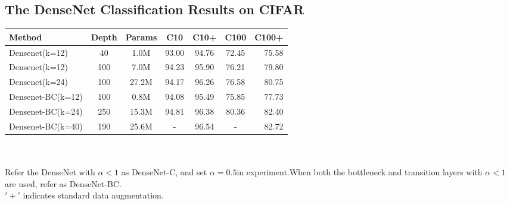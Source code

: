 \subsection{The DenseNet Classification Results on CIFAR}
\begin{tabular}{| l | c | c | c  | c | c | r |}
	\hline
	Method              &   Depth   & Params   & C10    & C10+    & C100   &   C100+ \\
	\hline
	Densenet(k=12)      &    40     & 1.0M     & 93.00  & 94.76   & 72.45  &   75.58  \\
	\hline
	Densenet(k=12)      &   100     & 7.0M     & 94.23  & 95.90   & 76.21  &   79.80  \\
	\hline
	Densenet(k=24)      &   100     & 27.2M    & 94.17  & 96.26   & 76.58  &   80.75  \\
	\hline
	Densenet-BC(k=12)   &   100     & 0.8M     & 94.08  & 95.49   & 75.85  &   77.73  \\
	\hline
	Densenet-BC(k=24)   &   250     & 15.3M    & 94.81  & 96.38   & 80.36  &   82.40  \\
	\hline
	Densenet-BC(k=40)   &   190     & 25.6M    & -      & 96.54   & -      &   82.72  \\
	\hline
\end{tabular}
\\ \hspace*{\fill} \\
Refer the DenseNet with $\alpha<1$ as DenseNet-C, and  set $\alpha=0.5$in experiment.When both the bottleneck and transition layers with $\alpha<1$
are used, refer  as DenseNet-BC.\\
$'+'$ indicates standard data augmentation.

